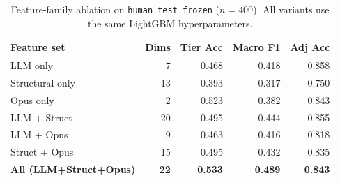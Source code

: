 \begin{table}[t]
\centering
\caption{Feature-family ablation on \texttt{human\_test\_frozen}
($n=400$). All variants use the same LightGBM hyperparameters.}
\label{tab:ablation}
\begin{tabular}{lrrrr}
\toprule
Feature set & Dims & Tier Acc & Macro F1 & Adj Acc \\
\midrule
LLM only & 7 & 0.468 & 0.418 & 0.858 \\
Structural only & 13 & 0.393 & 0.317 & 0.750 \\
Opus only & 2 & 0.523 & 0.382 & 0.843 \\
LLM + Struct & 20 & 0.495 & 0.444 & 0.855 \\
LLM + Opus & 9 & 0.463 & 0.416 & 0.818 \\
Struct + Opus & 15 & 0.495 & 0.432 & 0.835 \\
\midrule
\textbf{All (LLM+Struct+Opus)} & \textbf{22} & \textbf{0.533} & \textbf{0.489} & \textbf{0.843} \\
\bottomrule
\end{tabular}
\end{table}

